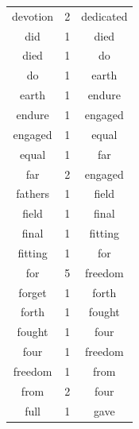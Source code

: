 \begin{multicols}{2}
\begin{tabular}{ccc}
devotion & 2 & dedicated \\
did & 1 & died \\
died & 1 & do \\
do & 1 & earth \\
earth & 1 & endure \\
endure & 1 & engaged \\
engaged & 1 & equal \\
equal & 1 & far \\
far & 2 & engaged \\
fathers & 1 & field \\
field & 1 & final \\
final & 1 & fitting \\
fitting & 1 & for \\
for & 5 & freedom \\
forget & 1 & forth \\
forth & 1 & fought \\
fought & 1 & four \\
four & 1 & freedom \\
freedom & 1 & from \\
from & 2 & four \\
full & 1 & gave \\
\end{tabular}

\columnbreak


\end{multicols}
